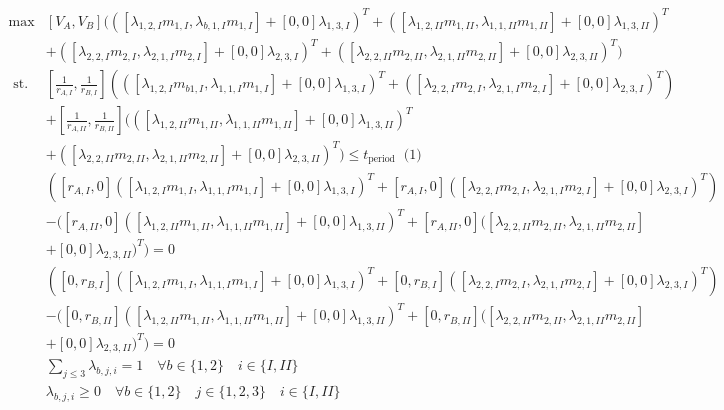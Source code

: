 \documentclass[11pt]{article}
\begin{document}
\noindent $\begin{aligned} 
    \max & [V_A, V_B] (([\lambda_{1,2,I} m_{1,I}, \lambda_{b,1,I} m_{1,I}] + [0,0] \lambda_{1,3,I})^T + ([\lambda_{1,2,II} m_{1,II}, \lambda_{1,1,II} m_{1,II}] + [0,0] \lambda_{1,3,II})^T \\
    &+ ([\lambda_{2,2,I} m_{2,I}, \lambda_{2,1,I} m_{2,I}] + [0,0] \lambda_{2,3,I})^T + ([\lambda_{2,2,II} m_{2,II}, \lambda_{2,1,II} m_{2,II}] + [0,0] \lambda_{2,3,II})^T) \\ 
    \text { st. } & [\frac{1}{r_{A,I}}, \frac{1}{r_{B,I}}](([\lambda_{1,2,I} m_{b1,I}, \lambda_{1,1,I} m_{1,I}] + [0,0] \lambda_{1,3,I})^T + ([\lambda_{2,2,I} m_{2,I}, \lambda_{2,1,I} m_{2,I}] + [0,0] \lambda_{2,3,I})^T)\\
    & + [\frac{1}{r_{A,II}}, \frac{1}{r_{B,II}}](([\lambda_{1,2,II} m_{1,II}, \lambda_{1,1,II} m_{1,II}] + [0,0] \lambda_{1,3,II})^T \\
    & + ([\lambda_{2,2,II} m_{2,II}, \lambda_{2,1,II} m_{2,II}] + [0,0] \lambda_{2,3,II})^T) \leqslant t_{\text {period }} \text { (1) } \\ 
    & ([r_{A,I},0] ([\lambda_{1,2,I} m_{1,I}, \lambda_{1,1,I} m_{1,I}] + [0,0] \lambda_{1,3,I})^T + [r_{A,I},0] ([\lambda_{2,2,I} m_{2,I}, \lambda_{2,1,I} m_{2,I}] + [0,0] \lambda_{2,3,I})^T) \\
    & - ([r_{A,II},0] ([\lambda_{1,2,II} m_{1,II}, \lambda_{1,1,II} m_{1,II}] + [0,0] \lambda_{1,3,II})^T + [r_{A,II},0] ([\lambda_{2,2,II} m_{2,II}, \lambda_{2,1,II} m_{2,II}] \\
    & + [0,0] \lambda_{2,3,II})^T) = 0\\
    & ([0,r_{B,I}] ([\lambda_{1,2,I} m_{1,I}, \lambda_{1,1,I} m_{1,I}] + [0,0] \lambda_{1,3,I})^T + [0,r_{B,I}] ([\lambda_{2,2,I} m_{2,I}, \lambda_{2,1,I} m_{2,I}] + [0,0] \lambda_{2,3,I})^T) \\
    & - ([0,r_{B,II}] ([\lambda_{1,2,II} m_{1,II}, \lambda_{1,1,II} m_{1,II}] + [0,0] \lambda_{1,3,II})^T + [0,r_{B,II}] ([\lambda_{2,2,II} m_{2,II}, \lambda_{2,1,II} m_{2,II}] \\
    &+ [0,0] \lambda_{2,3,II})^T) = 0\\
    & \sum_{j \leq 3} \lambda_{b,j,i} = 1 \quad \forall b \in \{1,2\} \quad i \in \{I,II\} \\
    & \lambda_{b,j,i} \geq 0 \quad \forall b \in \{1,2\} \quad j \in \{1,2,3\} \quad i \in \{I,II\} 
\end{aligned}$
\\
\\
\end{document}
